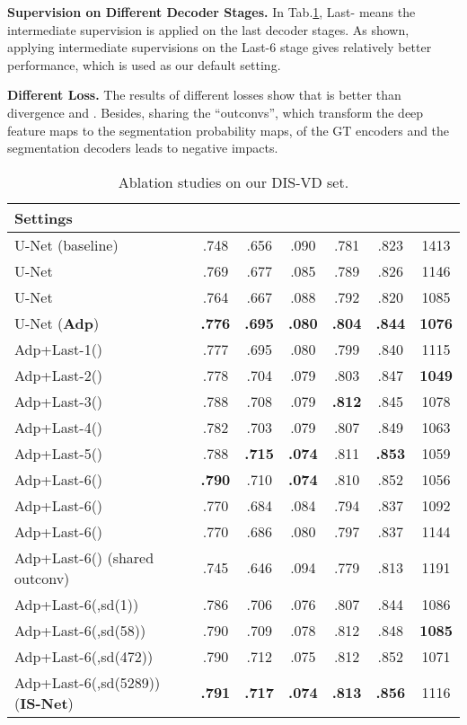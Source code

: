 \documentclass[10pt,twocolumn,letterpaper]{article}
\newcommand{\tabref}[1]{Tab.\ref{#1}}
\def\ourmodel{IS-Net}
\begin{document}
\noindent\textbf{Supervision on Different Decoder Stages.}
In \tabref{tab:abl}, Last- means the intermediate supervision is applied on the last  decoder stages. As shown, applying intermediate supervisions on the Last-6 stage gives relatively better performance, which is used as our default setting.

\noindent\textbf{Different Loss.}
The results of different losses show that  is better than  divergence and . Besides, sharing the ``outconvs'', which transform the deep feature maps to the segmentation probability maps, of the GT encoders and the segmentation decoders leads to negative impacts. 

\begin{table}[t!]
    \centering
    \scriptsize
    \caption{\small Ablation studies on our DIS-VD set.}\label{tab:abl}
    \renewcommand{\arraystretch}{1.0}
    \setlength\tabcolsep{1.0pt}
    \begin{tabular}{l|cccccc}
        \hline 
         Settings & 
          &  &  &  &  & \\
         \hline U-Net  (baseline) &.748 & .656 &.090 &.781 & .823 &1413\\
        U-Net   &.769 &.677 &.085 &.789 &.826 & 1146\\
        U-Net  &.764 &.667 &.088 &.792 &.820 & 1085\\
        \rowcolor{mygray}
        U-Net  (\textbf{Adp}) &\textbf{.776} &\textbf{.695} &\textbf{.080} &\textbf{.804} &\textbf{.844} & \textbf{1076}\\
        \hline 
        Adp+Last-1() &.777 &.695 &.080 &.799 &.840 &1115\\
        Adp+Last-2() &.778 &.704 &.079 &.803 &.847 &\textbf{1049}\\
        Adp+Last-3() &.788 &.708 &.079 &\textbf{.812} &.845 &1078\\
        Adp+Last-4() &.782 &.703 &.079 &.807 &.849 &1063\\
        Adp+Last-5() &.788 &\textbf{.715} &\textbf{.074} &.811 &\textbf{.853} &1059\\
        \rowcolor{mygray}
        Adp+Last-6() &\textbf{.790} &.710 &\textbf{.074} &.810 &.852 & 1056\\
        \hline 
        Adp+Last-6() &.770 &.684 &.084 &.794 &.837&1092\\
        Adp+Last-6() &.770 &.686 &.080 &.797 &.837&1144\\
        Adp+Last-6() (shared outconv) &.745 &.646 &.094 &.779 &.813 &1191\\
        \hline
        Adp+Last-6(,sd(1))  &.786 &.706 &.076 &.807 &.844 &1086\\
        Adp+Last-6(,sd(58)) &.790 &.709 &.078 &.812 &.848 &\textbf{1085}\\
        Adp+Last-6(,sd(472)) &.790 &.712 &.075 &.812 &.852 &1071\\
        \rowcolor{mygray}
        Adp+Last-6(,sd(5289)) (\textbf{\ourmodel}) &\textbf{.791} &\textbf{.717} &\textbf{.074} &\textbf{.813} &\textbf{.856} &1116\\
         \hline 
    \end{tabular}
\end{table}
\end{document}
